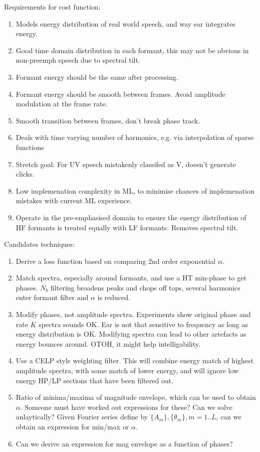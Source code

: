 \documentclass{article}
\begin{document}
Requirements for cost function:
\begin{enumerate}
\item Models energy distribution of real world speech, and way ear integrates energy.
\item Good time domain distribution in each formant, this may not be obvious in non-preemph speech due to spectral tilt.
\item Formant energy should be the same after processing.
\item Formant energy should be smooth between frames.  Avoid amplitude modulation at the frame rate.
\item Smooth transition between frames, don't break phase track.
\item Deals with time varying number of harmonics, e.g. via interpolation of sparse functions
\item Stretch goal: For UV speech mistakenly classifed as V, doesn't generate clicks.
\item Low implemenation complexity in ML, to minimise chances of implemenation mistakes with current ML experience.
\item Operate in the pre-emphasised domain to ensure the energy distribution of HF formants is treated equally with LF formants.  Removes spectral tilt.
\end{enumerate}

Candidates techniques:
\begin{enumerate}
\item Derive a loss function based on comparing 2nd order exponential $\alpha$.
\item Match spectra, especially around formants, and use a HT min-phase to get phases.  $N_b$ filtering broadens peaks and chops off tops, several harmonics enter formant filter and $\alpha$ is reduced.
\item Modify phases, not amplitude spectra.  Experiments show original phase and rate $K$ spectra sounds OK.  Ear is not that sensitive to frequency as long as energy distribution is OK.  Modifying spectra can lead to other artefacts as energy bounces around. OTOH, it might help intelligability.
\item Use a CELP style weighting filter.  This will combine energy match of highest amplitude spectra, with some match of lower energy, and will ignore low energy HP/LP sections that have been filtered out.
\item Ratio of minima/maxima of magnitude envelope, which can be used to obtain $\alpha$.  Someone must have worked out expressions for these?  Can we solve anlaytically?  Given Fourier series define by $\{A_m\}, \{\theta_m\},m=1..L$, can we obtain an expression for min/max or $\alpha$.
\item Can we derive an expression for mag envelope as a function of phases?
\end{enumerate}
\end{document}
